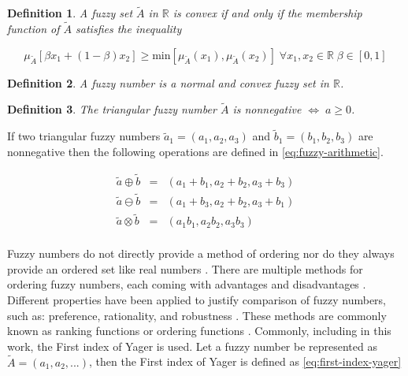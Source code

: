 \documentclass[ee,thesis]{usuthesis}
\newtheorem{definition}{Definition}[section]
\begin{document}
\begin{definition}
A fuzzy set \(\tilde{A}\) in \(\mathbb{R}\) is convex if and only if the membership function of \(\tilde{A}\) satisfies the inequality

\begin{equation*}
\mu_{\tilde{A}}[\beta x_1 + (1-\beta)x_2] \ge \text{min}[\mu_{\tilde{A}}(x_1), \mu_{\tilde{A}}(x_2)]\; \forall x_1, x_2 \in \mathbb{R}\; \beta \in [0,1]
\end{equation*}
\end{definition}

\begin{definition}
A fuzzy number is a normal and convex fuzzy set in \(\mathbb{R}\).
\end{definition}

\begin{definition}
\label{def:triangular-nonnegative}
The triangular fuzzy number \(\tilde{A}\) is nonnegative \(\iff\; a \ge 0\).
\end{definition}

\label{sec:fuzzy-arithmetic}

If two triangular fuzzy numbers \(\tilde{a}_1 = (a_1, a_2, a_3)\) and \(\tilde{b}_1 = (b_1, b_2, b_3)\) are nonnegative
then the following operations are defined in \ref{eq:fuzzy-arithmetic}.

\begin{equation}
\label{eq:fuzzy-arithmetic}
\begin{array}{lcl}
\tilde{a} \oplus \tilde{b} & = & (a_1 + b_1, a_2 + b_2, a_3 + b_3) \\
\tilde{a} \ominus \tilde{b} & = & (a_1 + b_3, a_2 + b_2, a_3 + b_1) \\
\tilde{a} \otimes \tilde{b} & = & (a_1 b_1, a_2 b_2, a_3 b_3)       \\
\end{array}
\end{equation}

\label{sec:comparing-fuzzy-numbers}

Fuzzy numbers do not directly provide a method of ordering nor do they always provide an ordered set like real numbers
\cite{bello-2019-fuzzy-activ}. There are multiple methods for ordering fuzzy numbers, each coming with advantages and
disadvantages \cite{mccahon-1990-compar}. Different properties have been applied to justify comparison of fuzzy
numbers, such as: preference, rationality, and robustness
\cite{jimenez-2007-linear-progr,bello-2019-fuzzy-activ,kaur-2016-introd-fuzzy}. These methods are commonly known as
ranking functions or ordering functions \cite{bello-2019-fuzzy-activ,das-2016-mathem-model,kaur-2016-introd-fuzzy}.
Commonly, including in this work, the First index of Yager \cite{yager-1981-proced-order} is used. Let a fuzzy number
be represented as \(\tilde{A} = (a_1,a_2,...)\), then the First index of Yager is defined as \ref{eq:first-index-yager}
\end{document}
